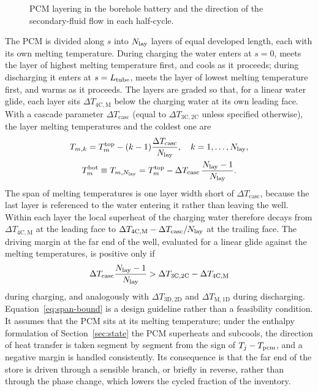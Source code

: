 \begin{figure}[htbp]
  \centering
  \begin{subfigure}{0.42\linewidth}\centering
  \end{subfigure}\hfill
  \begin{subfigure}{0.42\linewidth}\centering
  \end{subfigure}
  \caption{PCM layering in the borehole battery and the direction of the
  secondary-fluid flow in each half-cycle.}
  \label{fig:bb_geom}
\end{figure}

The PCM is divided along $s$ into $N_{\mathrm{lay}}$ layers of equal developed length,
each with its own melting temperature. During charging the water enters at
$s=0$, meets the layer of highest melting temperature first, and cools as it
proceeds; during discharging it enters at $s=L_{\mathrm{tube}}$, meets the layer of
lowest melting temperature first, and warms as it proceeds. The layers are
graded so that, for a linear water glide, each layer sits
$\Delta T_\mathrm{4C,M}$ below the charging water at its own leading face.
With a cascade parameter $\Delta T_\mathrm{casc}$ (equal to
$\Delta T_\mathrm{3C,2C}$ unless specified otherwise), the layer melting
temperatures and the coldest one are
\begin{gather}
  T_{m,k}=T_{m}^\mathrm{top}-(k-1)\frac{\Delta T_\mathrm{casc}}{N_{\mathrm{lay}}},
  \quad k=1,\ldots,N_{\mathrm{lay}},
  \notag\\
  T_{m}^\mathrm{bot}\equiv T_{m,N_{\mathrm{lay}}}
  =T_{m}^\mathrm{top}-\Delta T_\mathrm{casc}\,\frac{N_{\mathrm{lay}}-1}{N_{\mathrm{lay}}}.
  \label{eq:cascade}
\end{gather}
The span of melting temperatures is one layer width short of
$\Delta T_\mathrm{casc}$, because the last layer is referenced to the water
entering it rather than leaving the well. Within each layer the local
superheat of the charging water therefore decays from
$\Delta T_\mathrm{4C,M}$ at the leading face to
$\Delta T_\mathrm{4C,M}-\Delta T_\mathrm{casc}/N_{\mathrm{lay}}$ at the trailing face.
The driving margin at the far end of the well, evaluated for a linear glide
against the melting temperatures, is positive only if
\begin{equation}
  \Delta T_\mathrm{casc}\frac{N_{\mathrm{lay}}-1}{N_{\mathrm{lay}}}
  >\Delta T_\mathrm{3C,2C}-\Delta T_\mathrm{4C,M}
  \label{eq:span-bound}
\end{equation}
during charging, and analogously with $\Delta T_\mathrm{3D,2D}$ and
$\Delta T_\mathrm{M,1D}$ during discharging. Equation~\eqref{eq:span-bound} is
a design guideline rather than a feasibility condition. It assumes that the
PCM sits at its melting temperature; under the enthalpy formulation of
Section~\ref{sec:state} the PCM superheats and subcools, the direction of heat
transfer is taken segment by segment from the sign of $T_j-T_{\mathrm{pcm}}$, and a
negative margin is handled consistently. Its consequence is that the far end
of the store is driven through a sensible branch, or briefly in reverse,
rather than through the phase change, which lowers the cycled fraction of the
inventory.

